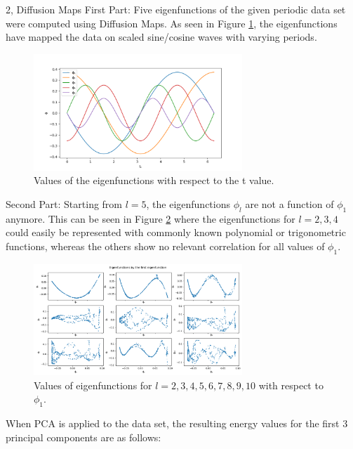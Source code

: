 \documentclass[10pt,a4paper]{article}
\begin{document}
\begin{task}{2, Diffusion Maps}
First Part: Five eigenfunctions of the given periodic data set were computed using Diffusion Maps. As seen in Figure \ref{fig:task2_part1}, the eigenfunctions have mapped the data on scaled sine/cosine waves with varying periods.

\begin{figure}[H]
\centering
\includegraphics[width=0.7\textwidth]{../plots/task2/task2_1.png}
\caption{Values of the eigenfunctions with respect to the t value.}
\label{fig:task2_part1}
\end{figure}

\bigbreak
Second Part: 
Starting from $l=5$, the eigenfunctions $\phi_l$ are not a function of $\phi_1$ anymore. This can be seen in Figure \ref{fig:task2_part2} where the eigenfunctions for $l=2, 3, 4$ could easily be represented with commonly known polynomial or trigonometric functions, whereas the others show no relevant correlation for all values of $\phi_1$. \\

\begin{figure}[H]
\centering
\includegraphics[width=0.7\textwidth]{../plots/task2/task2_2.png}
\caption{Values of eigenfunctions for $l=2, 3, 4, 5, 6, 7, 8, 9, 10$ with respect to $\phi_1$.}
\label{fig:task2_part2}
\end{figure}

When PCA is applied to the data set, the resulting energy values for the first 3 principal components are as follows: \\


\end{task}
\end{document}

